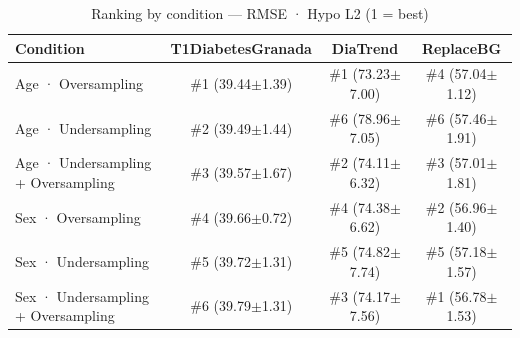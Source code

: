 \begin{table}[htbp]
\centering
\small
\caption{Ranking by condition — RMSE · Hypo L2  (1 = best)}
\label{tab:ranking_rmse_tbr_2_family_mechanism_random}
\begin{tabular}{lccc}
\toprule
\textbf{Condition} & \textbf{T1DiabetesGranada} & \textbf{DiaTrend} & \textbf{ReplaceBG} \\
\midrule
Age · Oversampling & \#1 (39.44$\pm$1.39) & \#1 (73.23$\pm$7.00) & \#4 (57.04$\pm$1.12) \\
Age · Undersampling & \#2 (39.49$\pm$1.44) & \#6 (78.96$\pm$7.05) & \#6 (57.46$\pm$1.91) \\
Age · Undersampling + Oversampling & \#3 (39.57$\pm$1.67) & \#2 (74.11$\pm$6.32) & \#3 (57.01$\pm$1.81) \\
\midrule
Sex · Oversampling & \#4 (39.66$\pm$0.72) & \#4 (74.38$\pm$6.62) & \#2 (56.96$\pm$1.40) \\
Sex · Undersampling & \#5 (39.72$\pm$1.31) & \#5 (74.82$\pm$7.74) & \#5 (57.18$\pm$1.57) \\
Sex · Undersampling + Oversampling & \#6 (39.79$\pm$1.31) & \#3 (74.17$\pm$7.56) & \#1 (56.78$\pm$1.53) \\
\bottomrule
\end{tabular}
\end{table}
